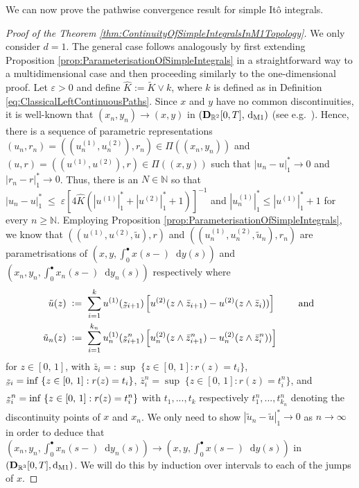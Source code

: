 \documentclass[11pt]{article}
\theoremstyle{definition}\newtheorem{example}[theorem]{Example}
\theoremstyle{definition}\newtheorem{counterexample}[theorem]{Counterexample}
\theoremstyle{definition}\newtheorem{remark}[theorem]{Remark}
\theoremstyle{definition}\newtheorem{defi}[theorem]{Definition}
\numberwithin{equation}{section}
\newcommand{\ubar}[1]{\underaccent{\bar}{#1}}
\newcommand{\N}{\mathbb{N}}
\newcommand{\R}{\mathbb{R}}
\newcommand{\D}{{\bf D}}											%
\newcommand*\diff{\mathop{}\!\mathrm{d}}								%
\renewcommand{\sup}[1]{\underset{#1}{\operatorname{sup}}\;}					%
\renewcommand{\inf}[1]{\underset{#1}{\operatorname{inf}}\;}					%
\renewcommand{\|}{\; : \, \;}											%
\newcommand{\dM}{\diff_{\operatorname{M1}}}							%
\begin{document}
We can now  prove the pathwise convergence result for simple It{\^o} integrals.
\begin{proof}[Proof of the Theorem \ref{thm:ContinuityOfSimpleIntegralsInM1Topology}]
	We only consider $d=1$. The general case follows analogously by first extending Proposition \ref{prop:ParameterisationOfSimpleIntegrals} in a straightforward way to a multidimensional case and then proceeding similarly to the one-dimensional proof. Let $\varepsilon > 0$ and define $\hat{K}:=\tilde{K} \vee k$, where $k$ is defined as in Definition \ref{eq:ClassicalLeftContinuousPaths}. Since $x$ and $y$ have no common discontinuities, it is well-known that $(x_n,y_n) \xrightarrow[]{} (x,y)$ in $(\D_{\R^2}[0,T], \, \dM)$ (see e.g.~\cite{whitt}). Hence, there is a sequence of parametric representations $(u_n,r_n)=((u^{(1)}_n, u^{(2)}_n), r_n) \in \Pi\left((x_n,y_n)\right)$ and $(u,r)=((u^{(1)}, u^{(2)}), r) \in \Pi\left((x,y)\right)$ such that $|u_n-u|^*_1 \to 0$ and $|r_n-r|^*_1 \to 0$. Thus, there is an $N \in \N$ so that $|u_n-u|_1^* \; \leq \; \varepsilon [4\hat{K}(|u^{(1)}|^*_1 + |u^{(2)}|^*_1 + 1)]^{-1}$ and $|u_n^{(1)}|^*_1 \leq |u^{(1)}|^*_1 + 1$ for every $n \geq \N$. Employing Proposition \ref{prop:ParameterisationOfSimpleIntegrals}, we know that $((u^{(1)}, u^{(2)},\tilde{u}),r)$ and $((u^{(1)}_n, u^{(2)}_n,\tilde{u}_n),r_n)$ are parametrisations of $(x,y,\int_0^\bullet x(s-)\diff y(s))$ and $(x_n,y_n,\int_0^\bullet x_n(s-)\diff y_n(s))$ respectively where
	\begin{align*}
		\tilde{u}(z) \; &\vcentcolon= \; \sum_{i=1}^k u^{(1)}(\ubar{z}_{i+1}) \left[u^{(2)}(z \wedge \bar{z}_{i+1}) - u^{(2)}(z \wedge \bar{z}_{i}))\right] \qquad \text{ and }\\
		\tilde{u}_n(z) \; &\vcentcolon= \; \sum_{i=1}^{k_n} u_n^{(1)}(\ubar{z}^n_{i+1}) \left[u_n^{(2)}(z \wedge \bar{z}^n_{i+1}) - u_n^{(2)}(z \wedge \bar{z}^n_{i}))\right] 
	\end{align*}
	for $z \in [0,\, 1]$, with $\bar{z}_i =: \sup{} \{z \in [0,\,1] : r(z) = t_i\}$, $\ubar{z}_i = \inf{} \{z \in [0,\,1] : r(z) = t_i\}$, $\bar{z}^n_i = \sup{} \{z \in [0,\,1] : r(z) = t^n_i\}$, and $\ubar{z}^n_i =\inf{} \{z \in [0,\,1] : r(z) = t^n_i\}$ with $t_1,...,t_k$ respectively $t_1^n,...,t_{k_n}^n$ denoting the discontinuity points of $x$ and $x_n$. We only need to show $ |\tilde{u}_n-\tilde{u}|^*_1 \to 0$ as $n\to \infty$ in order to deduce that $(x_n, y_n, \int_0^\bullet x_n(s-)\diff y_n(s)) \to (x, y, \int_0^\bullet x(s-)\diff y(s))$ in $(\D_{\R^3}[0,T], \dM)$. We will do this by induction over intervals to each of the jumps of $x$.
	

\end{proof}
\end{document}
